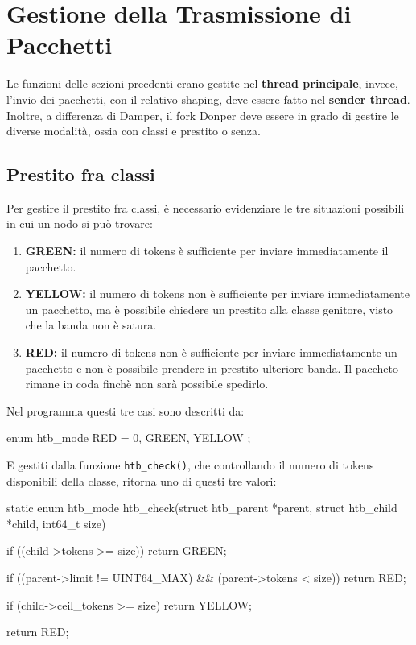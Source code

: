 \newpage
\section{Gestione della Trasmissione di Pacchetti}
Le funzioni delle sezioni precdenti erano gestite nel \textbf{thread principale}, invece, l'invio dei pacchetti, con il relativo shaping, deve essere fatto nel \textbf{sender thread}. \\ 
Inoltre, a differenza di Damper, il fork Donper deve essere in grado di gestire le diverse modalità, ossia con classi e prestito o senza.

\subsection{Prestito fra classi}
Per gestire il prestito fra classi, è necessario evidenziare le tre situazioni possibili in cui un nodo si può trovare:
\begin{enumerate}
  \item \textbf{GREEN:} il numero di tokens è sufficiente per inviare immediatamente il pacchetto.
  \item \textbf{YELLOW:} il numero di tokens non è sufficiente per inviare immediatamente un pacchetto, ma è possibile chiedere un prestito alla classe genitore, visto che la banda non è satura.
  \item \textbf{RED:} il numero di tokens non è sufficiente per inviare immediatamente un pacchetto e non è possibile prendere in prestito ulteriore banda. Il paccheto rimane in coda finchè non sarà possibile spedirlo.
\end{enumerate}
Nel programma questi tre casi sono descritti da:
\begin{clang}
enum htb_mode
{
  RED = 0,
  GREEN,
  YELLOW
};
\end{clang}
E gestiti dalla funzione \texttt{htb\_check()}, che controllando il numero di tokens disponibili della classe, ritorna uno di questi tre valori:
\begin{clang}
static enum htb_mode
htb_check(struct htb_parent *parent, struct htb_child *child, int64_t size)
{
  if ((child->tokens >= size)) {
    return GREEN;
  }

  if ((parent->limit != UINT64_MAX) && (parent->tokens < size)) {
    return RED;
  }

  if (child->ceil_tokens >= size) {
    return YELLOW;
  }

  return RED;
}
\end{clang}
\newpage

